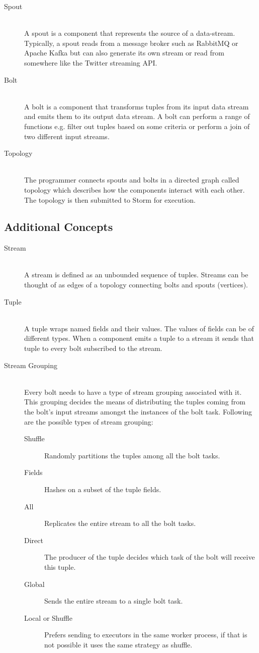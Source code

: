 \documentclass[bsc,logo,frontabs,twoside,singlespacing,normalheadings,parskip]{infthesis}\usepackage[]{graphicx}\usepackage[]{color}
\begin{document}
\begin{description}
  \item[Spout] \hfill \\
  A spout is a component that represents the source of a data-stream. Typically, a spout reads from a message broker such as RabbitMQ \cite{RabbitMQ} or Apache Kafka \cite{ApacheKafka} but can also generate its own stream or read from somewhere like the Twitter streaming API.
  \item[Bolt] \hfill \\
  A bolt is a component that transforms tuples from its input data stream and emits them to its output data stream. A bolt can perform a range of functions e.g. filter out tuples based on some criteria or perform a join of two different input streams.
  \item[Topology] \hfill \\
  The programmer connects spouts and bolts in a directed graph called topology which describes how the components interact with each other. The topology is then submitted to Storm for execution.
\end{description}

\subsection{Additional Concepts}

\begin{description}
  \item[Stream] \hfill \\
  A stream is defined as an unbounded sequence of tuples. Streams can be thought of as edges of a topology connecting bolts and spouts (vertices).
  \item[Tuple] \hfill \\
  A tuple wraps named fields and their values. The values of fields can be of different types. When a component emits a tuple to a stream it sends that tuple to every bolt subscribed to the stream.
  \item[Stream Grouping] \hfill \\
  Every bolt needs to have a type of stream grouping associated with it. This grouping decides the means of distributing the tuples coming from the bolt's input streams amongst the instances of the bolt task. Following are the possible types of stream grouping:
  \begin{description}
  	\item[Shuffle] Randomly partitions the tuples among all the bolt tasks.
  	\item[Fields] Hashes on a subset of the tuple fields.
  	\item[All] Replicates the entire stream to all the bolt tasks.
  	\item[Direct] The producer of the tuple decides which task of the bolt will receive this tuple.
  	\item[Global] Sends the entire stream to a single bolt task.
  	\item[Local or Shuffle] Prefers sending to executors in the same worker process, if that is not possible it uses the same strategy as shuffle.
  \end{description}
\end{description}
\end{document}
